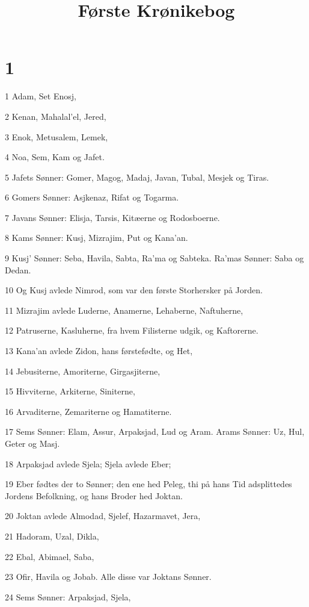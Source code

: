 

\title{Første Krønikebog}


\chapter{1}

\par 1 Adam, Set Enosj,
\par 2 Kenan, Mahalal'el, Jered,
\par 3 Enok, Metusalem, Lemek,
\par 4 Noa, Sem, Kam og Jafet.
\par 5 Jafets Sønner: Gomer, Magog, Madaj, Javan, Tubal, Mesjek og Tiras.
\par 6 Gomers Sønner: Asjkenaz, Rifat og Togarma.
\par 7 Javans Sønner: Elisja, Tarsis, Kitæerne og Rodosboerne.
\par 8 Kams Sønner: Kusj, Mizrajim, Put og Kana'an.
\par 9 Kusj' Sønner: Seba, Havila, Sabta, Ra'ma og Sabteka. Ra'mas Sønner: Saba og Dedan.
\par 10 Og Kusj avlede Nimrod, som var den første Storhersker på Jorden.
\par 11 Mizrajim avlede Luderne, Anamerne, Lehaberne, Naftuherne,
\par 12 Patruserne, Kasluherne, fra hvem Filisterne udgik, og Kaftorerne.
\par 13 Kana'an avlede Zidon, hans førstefødte, og Het,
\par 14 Jebusiterne, Amoriterne, Girgasjiterne,
\par 15 Hivviterne, Arkiterne, Siniterne,
\par 16 Arvaditerne, Zemariterne og Hamatiterne.
\par 17 Sems Sønner: Elam, Assur, Arpaksjad, Lud og Aram. Arams Sønner: Uz, Hul, Geter og Masj.
\par 18 Arpaksjad avlede Sjela; Sjela avlede Eber;
\par 19 Eber fødtes der to Sønner; den ene hed Peleg, thi på hans Tid adsplittedes Jordens Befolkning, og hans Broder hed Joktan.
\par 20 Joktan avlede Almodad, Sjelef, Hazarmavet, Jera,
\par 21 Hadoram, Uzal, Dikla,
\par 22 Ebal, Abimael, Saba,
\par 23 Ofir, Havila og Jobab. Alle disse var Joktans Sønner.
\par 24 Sems Sønner: Arpaksjad, Sjela,
